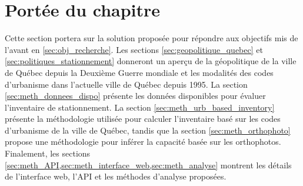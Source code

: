 \label{sec:Methodologie}
\section{Portée du chapitre}
Cette section portera sur la solution proposée pour répondre aux objectifs mis de l'avant en \ref{sec:obj_recherche}. Les sections \ref{sec:geopolitique_quebec} et \ref{sec:politiques_stationnement} donneront un aperçu de la géopolitique de la ville de Québec depuis la Deuxième Guerre mondiale et les modalités des codes d'urbanisme dans l'actuelle ville de Québec depuis 1995. La section \ref{sec:meth_donnees_dispo} présente les données disponibles pour évaluer l'inventaire de stationnement. La section \ref{sec:meth_urb_based_inventory} présente la méthodologie utilisée pour calculer l'inventaire basé sur les codes d'urbanisme de la ville de Québec, tandis que la section \ref{sec:meth_orthophoto} propose une méthodologie pour inférer la capacité basée sur les orthophotos. Finalement, les sections \ref{sec:meth_API,sec:meth_interface_web,sec:meth_analyse} montrent les détails de l'interface web, l'API et les méthodes d'analyse proposées.
